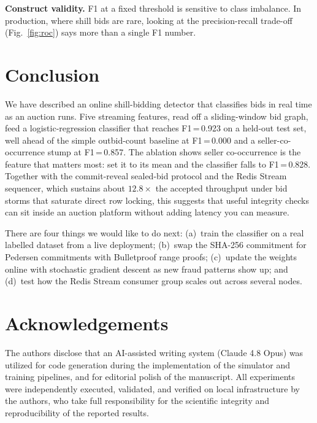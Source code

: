 \documentclass[conference]{IEEEtran}
\begin{document}
\textbf{Construct validity.} F1 at a fixed threshold is sensitive to
class imbalance. In production, where shill bids are rare, looking at the
precision-recall trade-off (Fig.~\ref{fig:roc}) says more than a single
F1 number.

\section{Conclusion}

We have described an online shill-bidding detector that classifies bids
in real time as an auction runs. Five streaming features, read off a
sliding-window bid graph, feed a logistic-regression classifier that
reaches F1\,=\,0.923 on a held-out test set, well ahead of the simple
outbid-count baseline at F1\,=\,0.000 and a seller-co-occurrence stump at
F1\,=\,0.857. The ablation shows seller co-occurrence is the feature that
matters most: set it to its mean and the classifier falls to
F1\,=\,0.828. Together with the commit-reveal sealed-bid protocol and the Redis
Stream sequencer, which sustains about $12.8\times$ the accepted
throughput under bid storms that saturate direct row locking, this
suggests that useful integrity checks can sit inside an auction platform
without adding latency you can measure.

There are four things we would like to do next: (a)~train the classifier
on a real labelled dataset from a live deployment; (b)~swap the SHA-256
commitment for Pedersen commitments with Bulletproof range proofs;
(c)~update the weights online with stochastic gradient descent as new
fraud patterns show up; and (d)~test how the Redis Stream consumer group
scales out across several nodes.

\section*{Acknowledgements}
The authors disclose that an AI-assisted writing system (Claude 4.8 Opus) was utilized for code generation during the implementation of the simulator and training pipelines, and for editorial polish of the manuscript. All experiments were independently executed, validated, and verified on local infrastructure by the authors, who take full responsibility for the scientific integrity and reproducibility of the reported results.

\balance


\end{document}

